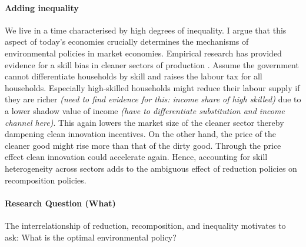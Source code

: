\documentclass[12pt]{article}
\newcommand{\ar}{$\Rightarrow$ \ }
\begin{document}
\paragraph{Adding inequality}
We live in a time characterised by high degrees of inequality. I argue that this aspect of today's economies crucially determines the mechanisms of environmental policies in market economies. Empirical research has provided evidence for a skill bias in cleaner sectors of production \citep{Consoli2016DoCapital}. Assume the government cannot differentiate households by skill and raises the labour tax for all households. Especially high-skilled households might reduce their labour supply if they are richer \textit{(need to find evidence for this: income share of high skilled)} due to a lower shadow value of income \textit{(have to differentiate substitution and income channel here)}. This again lowers the market size of the cleaner sector thereby dampening clean innovation incentives. On the other hand, the price of the cleaner good might rise more than that of the dirty good. Through the price effect clean innovation could accelerate again. Hence, accounting for skill heterogeneity across sectors adds to the ambiguous effect of reduction policies on recomposition policies.


\paragraph{Research Question (What)}

The interrelationship of reduction, recomposition, and inequality motivates to ask: What is the optimal environmental policy? 
 
\newpage
\end{document}
